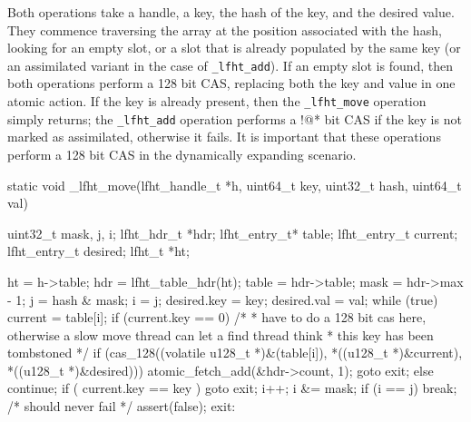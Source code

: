 Both operations take a handle, a key, the hash of the key, and the
desired value. They commence traversing the array at the position
associated with the hash, looking for an empty slot, or a slot that is
already populated by the same key (or an assimilated variant in the
case of \texttt{\_lfht\_add}). If an empty slot is found, then both operations
perform a 128 bit CAS, replacing both the key and value in one atomic action.
If the key is already present, then the \texttt{\_lfht\_move} operation simply
returns; the \texttt{\_lfht\_add} operation performs a !@* bit CAS if the key
is not marked as assimilated, otherwise it fails. It is important that these operations
perform a 128 bit CAS in the dynamically expanding scenario.




\begin{center}
\begin{clisting}
static void _lfht_move(lfht_handle_t *h, uint64_t key, uint32_t hash, uint64_t val){
  uint32_t mask, j, i;
  lfht_hdr_t *hdr;
  lfht_entry_t*  table;
  lfht_entry_t current;
  lfht_entry_t desired;
  lfht_t *ht;

  ht = h->table;
  hdr = lfht_table_hdr(ht);
  table = hdr->table;
  mask = hdr->max - 1;
  j = hash & mask;
  i = j;
  desired.key = key;
  desired.val = val;
  while (true) {
    current = table[i];
    if (current.key == 0){
      /* 
       * have to do a 128 bit cas here, otherwise a slow move thread can let a find thread think
       * this key has been tombstoned
       */
      if (cas_128((volatile u128_t *)&(table[i]), *((u128_t *)&current),  *((u128_t *)&desired))){
        atomic_fetch_add(&hdr->count, 1);
        goto exit;
      } else {
        continue;
      }
    }
    if ( current.key ==  key ){
      goto exit;
    }
    i++;
    i &= mask;
    if (i == j) break;
  }
  /* should never fail */
  assert(false);
 exit:
}
\end{clisting}
\end{center}




